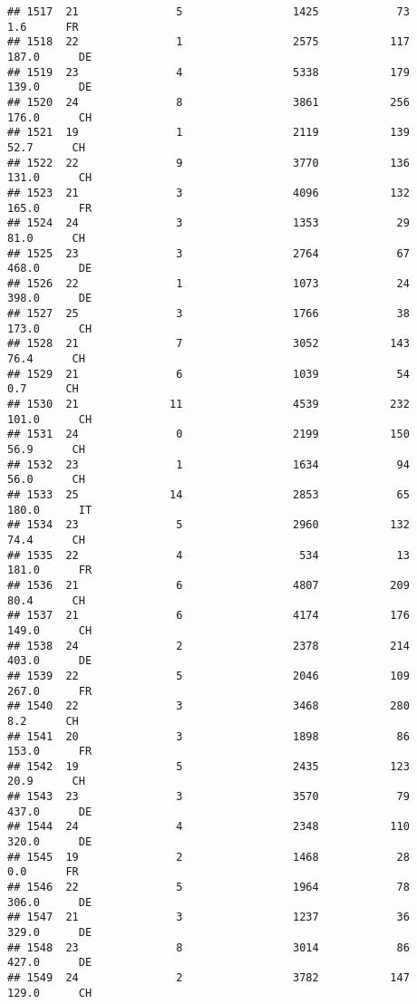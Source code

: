 \documentclass[
]{article}
\begin{document}
\begin{verbatim}
## 1517  21               5                 1425            73      1.6      FR
## 1518  22               1                 2575           117    187.0      DE
## 1519  23               4                 5338           179    139.0      DE
## 1520  24               8                 3861           256    176.0      CH
## 1521  19               1                 2119           139     52.7      CH
## 1522  22               9                 3770           136    131.0      CH
## 1523  21               3                 4096           132    165.0      FR
## 1524  24               3                 1353            29     81.0      CH
## 1525  23               3                 2764            67    468.0      DE
## 1526  22               1                 1073            24    398.0      DE
## 1527  25               3                 1766            38    173.0      CH
## 1528  21               7                 3052           143     76.4      CH
## 1529  21               6                 1039            54      0.7      CH
## 1530  21              11                 4539           232    101.0      CH
## 1531  24               0                 2199           150     56.9      CH
## 1532  23               1                 1634            94     56.0      CH
## 1533  25              14                 2853            65    180.0      IT
## 1534  23               5                 2960           132     74.4      CH
## 1535  22               4                  534            13    181.0      FR
## 1536  21               6                 4807           209     80.4      CH
## 1537  21               6                 4174           176    149.0      CH
## 1538  24               2                 2378           214    403.0      DE
## 1539  22               5                 2046           109    267.0      FR
## 1540  22               3                 3468           280      8.2      CH
## 1541  20               3                 1898            86    153.0      FR
## 1542  19               5                 2435           123     20.9      CH
## 1543  23               3                 3570            79    437.0      DE
## 1544  24               4                 2348           110    320.0      DE
## 1545  19               2                 1468            28      0.0      FR
## 1546  22               5                 1964            78    306.0      DE
## 1547  21               3                 1237            36    329.0      DE
## 1548  23               8                 3014            86    427.0      DE
## 1549  24               2                 3782           147    129.0      CH

\end{verbatim}
\end{document}
